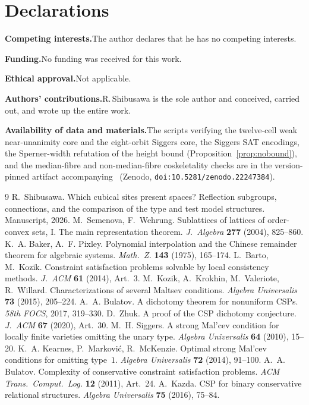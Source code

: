 \documentclass[11pt]{amsart}
\theoremstyle{plain}
\theoremstyle{definition}
\begin{document}


\section*{Declarations}

\noindent\textbf{Competing interests.}\quad The author declares that he has
no competing interests.

\noindent\textbf{Funding.}\quad No funding was received for this work.

\noindent\textbf{Ethical approval.}\quad Not applicable.

\noindent\textbf{Authors' contributions.}\quad R.\,Shibusawa is the sole
author and conceived, carried out, and wrote up the entire work.

\noindent\textbf{Availability of data and materials.}\quad The scripts
verifying the twelve-cell weak near-unanimity core and the eight-orbit
Siggers core, the Siggers SAT encodings, the Sperner-width refutation of
the height bound (Proposition~\ref{prop:nobound}), and the median-fibre and
non-median-fibre coskeletality checks are in the version-pinned artifact
accompanying~\cite{PaperW}
(Zenodo, \texttt{doi:10.5281/zenodo.22247384}).

\begin{thebibliography}{9}
R.~Shibusawa. Which cubical sites present spaces? Reflection subgroups,
connections, and the comparison of the type and test model structures.
Manuscript, 2026.
M.~Semenova, F.~Wehrung. Sublattices of lattices of order-convex sets, I.
The main representation theorem. \emph{J.\ Algebra} \textbf{277} (2004),
825--860.
K.~A. Baker, A.~F. Pixley. Polynomial interpolation and the Chinese
remainder theorem for algebraic systems. \emph{Math.\ Z.} \textbf{143}
(1975), 165--174.
L.~Barto, M.~Kozik. Constraint satisfaction problems solvable by local
consistency methods. \emph{J.\ ACM} \textbf{61} (2014), Art.~3.
M.~Kozik, A.~Krokhin, M.~Valeriote, R.~Willard. Characterizations of
several Maltsev conditions. \emph{Algebra Universalis} \textbf{73}
(2015), 205--224.
A.~A. Bulatov. A dichotomy theorem for nonuniform CSPs. \emph{58th
FOCS}, 2017, 319--330.
D.~Zhuk. A proof of the CSP dichotomy conjecture. \emph{J.\ ACM}
\textbf{67} (2020), Art.~30.
M.~H. Siggers. A strong Mal'cev condition for locally finite varieties
omitting the unary type. \emph{Algebra Universalis} \textbf{64} (2010),
15--20.
K.~A. Kearnes, P.~Markovi\'c, R.~McKenzie. Optimal strong Mal'cev
conditions for omitting type~$1$. \emph{Algebra Universalis} \textbf{72}
(2014), 91--100.
A.~A. Bulatov. Complexity of conservative constraint satisfaction
problems. \emph{ACM Trans.\ Comput.\ Log.} \textbf{12} (2011), Art.~24.
A.~Kazda. CSP for binary conservative relational structures.
\emph{Algebra Universalis} \textbf{75} (2016), 75--84.
\end{thebibliography}
\end{document}
